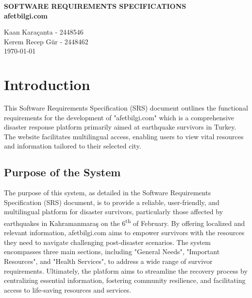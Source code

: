\documentclass[11pt,a4paper]{article}
\begin{document}
\begin{titlepage}
    \centering
    \vspace*{\fill}
    \huge
    \textbf{SOFTWARE REQUIREMENTS SPECIFICATIONS}\\
    \vspace{1cm}
    \textbf{afetbilgi.com}

    \vspace{1cm}
    \large
    Kaan Karaçanta - 2448546\\
    Kerem Recep Gür - 2448462\\
    \vspace{1cm}
    \today
    \vspace*{\fill}
\end{titlepage}

\newpage
\tableofcontents
\newpage
\listoffigures
\newpage
\listoftables
\newpage


\section{Introduction} 
This Software Requirements Specification (SRS) document outlines the functional requirements for the development of "afetbilgi.com" which is a comprehensive disaster response platform primarily aimed at earthquake survivors in Turkey. The website facilitates multilingual access, enabling users to view vital resources and information tailored to their selected city. 

\subsection{Purpose of the System}
The purpose of this system, as detailed in the Software Requirements Specification (SRS) document, is to provide a reliable, user-friendly, and multilingual platform for disaster survivors, particularly those affected by earthquakes in Kahramanmaraş on the 6\textsuperscript{th} of February. By offering localized and relevant information, afetbilgi.com aims to empower survivors with the resources they need to navigate challenging post-disaster scenarios. The system encompasses three main sections, including "General Needs", "Important Resources", and "Health Services", to address a wide range of survivor requirements. Ultimately, the platform aims to streamline the recovery process by centralizing essential information, fostering community resilience, and facilitating access to life-saving resources and services.
\end{document}
